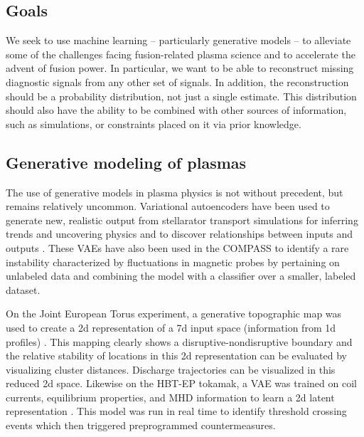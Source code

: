 \subsection{Goals}
We seek to use machine learning -- particularly generative models -- to alleviate some of the challenges facing fusion-related plasma science and to accelerate the advent of fusion power. In particular, we want to be able to reconstruct missing diagnostic signals from any other set of signals. In addition, the reconstruction should be a probability distribution, not just a single estimate. This distribution should also have the ability to be combined with other sources of information, such as simulations, or constraints placed on it via prior knowledge. 

\subsection{Generative modeling of plasmas}

The use of generative models in plasma physics is not without precedent, but remains relatively uncommon. Variational autoencoders \cite{kingma_auto-encoding_2022} have been used to generate new, realistic output from stellarator transport simulations for inferring trends and uncovering physics \cite{lennart_van_rijn_minimizing_2022} and to discover relationships between inputs and outputs \cite{vos_discovery_2024}. These VAEs have also been used in the COMPASS to identify a rare instability characterized by fluctuations in magnetic probes \cite{skvara_detection_2020} by pertaining on unlabeled data and combining the model with a classifier over a smaller, labeled dataset. 

On the Joint European Torus experiment, a generative topographic map was used to create a 2d representation of a 7d input space (information from 1d profiles) \cite{pau_machine_2019}. This mapping clearly shows a disruptive-nondisruptive boundary and the relative stability of locations in this 2d representation can be evaluated by visualizing cluster distances. Discharge trajectories can be visualized in this reduced 2d space. Likewise on the HBT-EP tokamak, a VAE was trained on coil currents, equilibrium properties, and MHD information to learn a 2d latent representation \cite{wei_dimensionality_2021}. This model was run in real time to identify threshold crossing events which then triggered preprogrammed countermeasures. 

